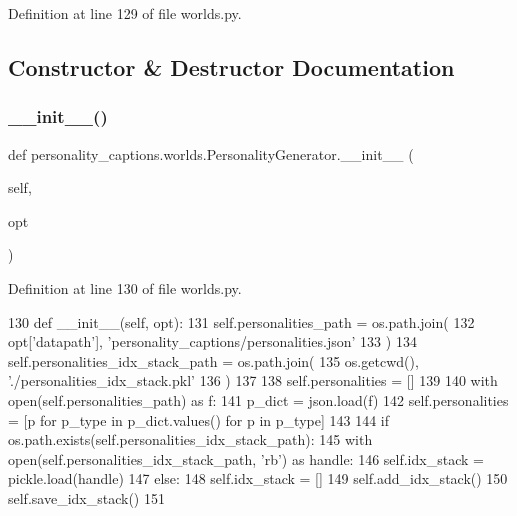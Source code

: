 Definition at line 129 of file worlds.\+py.



\subsection{Constructor \& Destructor Documentation}
\mbox{\label{classpersonality__captions_1_1worlds_1_1PersonalityGenerator_a9964a939fc695387f9f3f4d30b8cea0f}} 
\subsubsection{\texorpdfstring{\+\_\+\+\_\+init\+\_\+\+\_\+()}{\_\_init\_\_()}}
{\footnotesize\ttfamily def personality\+\_\+captions.\+worlds.\+Personality\+Generator.\+\_\+\+\_\+init\+\_\+\+\_\+ (\begin{DoxyParamCaption}\item[{}]{self,  }\item[{}]{opt }\end{DoxyParamCaption})}



Definition at line 130 of file worlds.\+py.


\begin{DoxyCode}
130     \textcolor{keyword}{def }\_\_init\_\_(self, opt):
131         self.personalities\_path = os.path.join(
132             opt[\textcolor{stringliteral}{'datapath'}], \textcolor{stringliteral}{'personality\_captions/personalities.json'}
133         )
134         self.personalities\_idx\_stack\_path = os.path.join(
135             os.getcwd(), \textcolor{stringliteral}{'./personalities\_idx\_stack.pkl'}
136         )
137 
138         self.personalities = []
139 
140         with open(self.personalities\_path) \textcolor{keyword}{as} f:
141             p\_dict = json.load(f)
142             self.personalities = [p \textcolor{keywordflow}{for} p\_type \textcolor{keywordflow}{in} p\_dict.values() \textcolor{keywordflow}{for} p \textcolor{keywordflow}{in} p\_type]
143 
144         \textcolor{keywordflow}{if} os.path.exists(self.personalities\_idx\_stack\_path):
145             with open(self.personalities\_idx\_stack\_path, \textcolor{stringliteral}{'rb'}) \textcolor{keyword}{as} handle:
146                 self.idx\_stack = pickle.load(handle)
147         \textcolor{keywordflow}{else}:
148             self.idx\_stack = []
149             self.add\_idx\_stack()
150             self.save\_idx\_stack()
151 
\end{DoxyCode}


